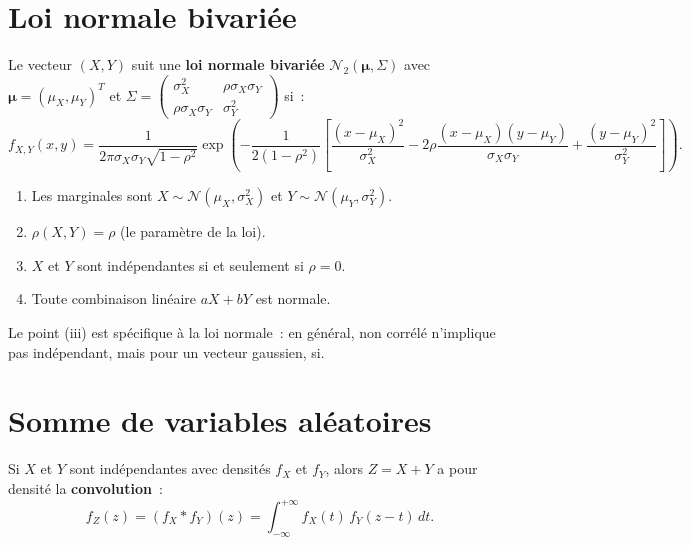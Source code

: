 \section{Loi normale bivari\'ee}

\begin{definition}
Le vecteur $(X, Y)$ suit une \textbf{loi normale bivari\'ee}
$\mathcal{N}_2(\boldsymbol{\mu}, \Sigma)$ avec
$\boldsymbol{\mu} = (\mu_X, \mu_Y)^T$ et
$\Sigma = \begin{pmatrix} \sigma_X^2 & \rho\sigma_X\sigma_Y \\
\rho\sigma_X\sigma_Y & \sigma_Y^2 \end{pmatrix}$ si~:
\[
    f_{X,Y}(x,y) = \frac{1}{2\pi\sigma_X\sigma_Y\sqrt{1-\rho^2}}
    \exp\!\left(-\frac{1}{2(1-\rho^2)}\left[
    \frac{(x-\mu_X)^2}{\sigma_X^2}
    - 2\rho\frac{(x-\mu_X)(y-\mu_Y)}{\sigma_X\sigma_Y}
    + \frac{(y-\mu_Y)^2}{\sigma_Y^2}
    \right]\right).
\]
\end{definition}

\begin{theoreme}
\begin{enumerate}[label=(\roman*)]
    \item Les marginales sont $X \sim \mathcal{N}(\mu_X, \sigma_X^2)$ et
          $Y \sim \mathcal{N}(\mu_Y, \sigma_Y^2)$.
    \item $\rho(X,Y) = \rho$ (le param\`etre de la loi).
    \item $X$ et $Y$ sont ind\'ependantes si et seulement si $\rho = 0$.
    \item Toute combinaison lin\'eaire $aX + bY$ est normale.
\end{enumerate}
\end{theoreme}

\begin{remarque}
Le point (iii) est sp\'ecifique \`a la loi normale~: en g\'en\'eral, non corr\'el\'e
n'implique pas ind\'ependant, mais pour un vecteur gaussien, si.
\end{remarque}

\section{Somme de variables al\'eatoires}

\begin{theoreme}[Convolution]
Si $X$ et $Y$ sont ind\'ependantes avec densit\'es $f_X$ et $f_Y$, alors
$Z = X + Y$ a pour densit\'e la \textbf{convolution}~:
\[
    f_Z(z) = (f_X * f_Y)(z) = \int_{-\infty}^{+\infty} f_X(t)\, f_Y(z - t)\, dt.
\]
\end{theoreme}

